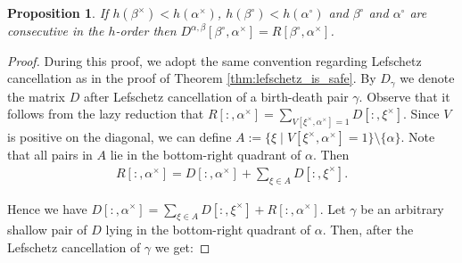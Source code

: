 \documentclass[a4paper,12pt, USenglish,cleveref,autoref,thm-restate]{article}
\newtheorem{proposition}[theorem]{Proposition}
\newcommand{\mf}{h}
\newcommand{\mR}{R}
\newcommand{\mV}{V}
\newcommand{\mD}{D}
\newcommand{\bth}[1]{#1^\circ}
\newcommand{\dth}[1]{#1^{\!\times}}
\newcommand{\bds}{\alpha}
\newcommand{\bdt}{\beta}
\newcommand{\bda}{\xi}
\newcommand{\bdb}{\gamma}
\begin{document}
\begin{appendices}
\begin{proposition}\label{prop:optimization}
    If $\mf(\dth\bdt) < \mf(\dth\bds)$, $\mf(\bth\bdt) < \mf(\bth\bds)$ and $\bth\bdt$ and $\bth\bds$ are consecutive in the $\mf$-order then $\mD^{\bds,\bdt}[\bth\bdt,\dth\bds] = \mR[\bth\bdt,\dth\bds]$.
\end{proposition}

\begin{proof}
   During this proof, we adopt the same convention regarding Lefschetz cancellation as in the proof of Theorem \ref{thm:lefschetz_is_safe}. By $\mD_{\bdb}$ we denote the matrix $\mD$ after Lefschetz cancellation of a birth-death pair $\bdb$. 
   Observe that it follows from the lazy reduction that $\mR[:,\dth\bds] = \sum\limits_{\mV[\dth\bda,\dth\bds] = 1} \mD[:,\dth\bda]$. 
    Since $\mV$ is positive on the diagonal, we can define $A := \{ \bda \mid \mV[\dth\bda,\dth\bds] = 1 \} \setminus \{\bds\}$. 
    Note that all pairs in $A$ lie in the bottom-right quadrant of $\bds$. Then 
    \begin{align*}
        \mR[:,\dth\alpha] = \mD[:,\dth\bds]+\sum\limits_{\bda \in A} \mD[:,\dth\bda].
    \end{align*}

    \noindent Hence we have $\mD[:,\dth\alpha] = \sum\limits_{\bda \in A} \mD[:,\dth\bda] + \mR[:,\dth\bds]$. 
    Let $\bdb$ be an arbitrary shallow pair of $\mD$ lying in the bottom-right quadrant of $\bds$.
    Then, after the Lefschetz cancellation of $\bdb$ we get:


\end{proof}
\end{appendices}
\end{document}
